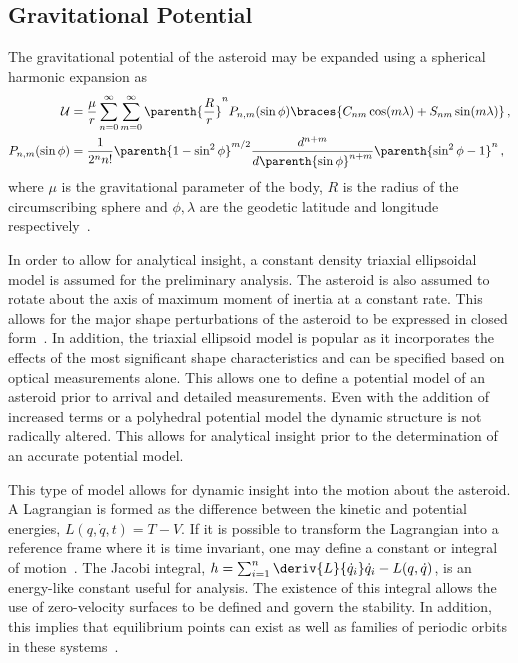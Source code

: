 \documentclass[11pt,draft]{article} %
\begin{document}
\subsection{Gravitational Potential}
The gravitational potential of the asteroid may be expanded using a spherical harmonic expansion as
\begin{align*}
	\mathcal{U} &= \frac{\mu}{r} \sum_{n=0}^\infty \sum_{m=0}^\infty \parenth{\frac{R}{r}}^nP_{n,m}(\sin \phi) \braces{ C_{nm} \cos(m \lambda) + S_{nm} \sin(m \lambda)} \, , \\
	P_{n,m}(\sin \phi) &= \frac{1}{2^n n !} \parenth{1 - \sin^2 \phi}^{m/2} \frac{d^{n+m}}{d \parenth{\sin \phi}^{n+m}} \parenth{\sin^2 \phi -1}^n \, ,
\end{align*}
where \( \mu \) is the gravitational parameter of the body, \( R \) is the radius of the circumscribing sphere and \( \phi, \lambda \) are the geodetic latitude and longitude respectively~\cite{vallado2001}.

In order to allow for analytical insight, a constant density triaxial ellipsoidal model is assumed for the preliminary analysis. 
The asteroid is also assumed to rotate about the axis of maximum moment of inertia at a constant rate.
This allows for the major shape perturbations of the asteroid to be expressed in closed form~\cite{scheeres1994}.
In addition, the triaxial ellipsoid model is popular as it incorporates the effects of the most significant shape characteristics and can be specified based on optical measurements alone.
This allows one to define a potential model of an asteroid prior to arrival and detailed measurements. 
Even with the addition of increased terms or a polyhedral potential model the dynamic structure is not radically altered. 
This allows for analytical insight prior to the determination of an accurate potential model.

This type of model allows for dynamic insight into the motion about the asteroid.
A Lagrangian is formed as the difference between the kinetic and potential energies, \( L(q, \dot{q}, t) =T - V \).
If it is possible to transform the Lagrangian into a reference frame where it is time invariant, one may define a constant or integral of motion~\cite{greenwood1988}.
The Jacobi integral, \( h = \sum_{i=1}^n \deriv{L}{\dot{q}_i} \dot{q}_i - L(q,\dot{q}) \), is an energy-like constant useful for analysis.
The existence of this integral allows the use of zero-velocity surfaces to be defined and govern the stability.
In addition, this implies that equilibrium points can exist as well as families of periodic orbits in these systems~\cite{scheeres2012}.
 
\end{document}
